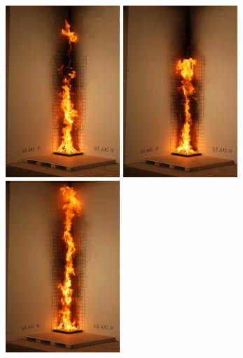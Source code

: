 \documentclass[twoside]{uocthesis}
\begin{document}
{\begin{figure}[p]
	\includegraphics[width=1.7in]{../Figures/GBGAS10_IMG_2049}
	\includegraphics[width=1.7in]{../Figures/GBGAS10_IMG_2050} 
	\includegraphics[width=1.7in]{../Figures/GBGAS10_IMG_2051} \\


\end{figure}}
\end{document}
